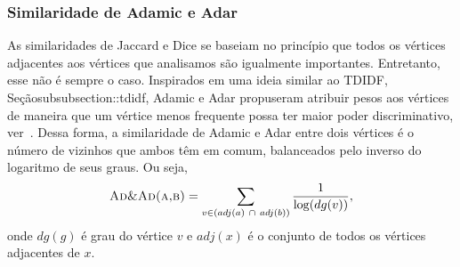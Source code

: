 \subsubsection{ Similaridade de Adamic e Adar}
\label{subsubsection::inverselog}

As similaridades de Jaccard e Dice se baseiam no princípio que todos os vértices adjacentes aos vértices que analisamos são igualmente importantes. Entretanto, esse não é sempre o caso.
Inspirados em uma ideia similar ao TDIDF, Seção{subsubsection::tdidf}, Adamic e Adar propuseram atribuir pesos aos vértices de maneira que um vértice menos frequente possa ter maior poder discriminativo, ver~\cite{Adamic03}. Dessa forma, a similaridade de Adamic e Adar entre dois vértices é o número de vizinhos que ambos têm em comum, balanceados pelo inverso do logaritmo de seus graus. Ou seja,
\begin{equation}
\textsc{Ad\&Ad(a,b)} =  \sum\limits_{v \in (adj(a)\ \cap\ adj(b))} \frac{1}{ \log(dg(v))},
\end{equation}
onde $dg(g)$ é grau do vértice $v$ e $adj(x)$ é o conjunto de todos os vértices adjacentes de $x$. 






